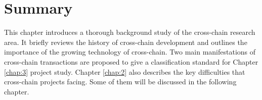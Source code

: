 \section{Summary}

\noindent This chapter introduces a thorough background study of the cross-chain research area. It briefly reviews the history of cross-chain development and outlines the importance of the growing technology of cross-chain. Two main manifestations of cross-chain transactions are proposed to give a classification standard for Chapter \ref{chap:3} project study. Chapter \ref{chap:2} also describes the key difficulties that cross-chain projects facing. Some of them will be discussed in the following chapter.